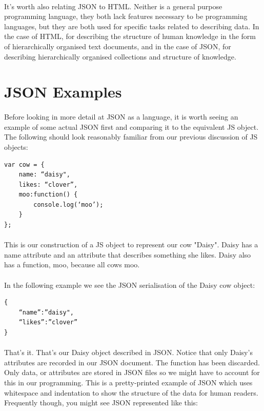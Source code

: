 \paragraph{} It's worth also relating JSON to HTML. Neither is a general purpose programming language, they both lack features necessary to be programming languages, but they are both used for specific tasks related to describing data. In the case of HTML, for describing the structure of human knowledge in the form of hierarchically organised text documents, and in the case of JSON, for describing hierarchically organised collections and structure of knowledge.



\section{JSON Examples}
\paragraph{} Before looking in more detail at JSON as a language, it is worth seeing an example of some actual JSON first and comparing it to the equivalent JS object. The following should look reasonably familiar from our previous discussion of JS objects:

\begin{lstlisting}
var cow = {
	name: “daisy",
	likes: “clover”, 
	moo:function() {
		console.log(‘moo’);
	}
};
\end{lstlisting}

\paragraph{} This is our construction of a JS object to represent our cow "Daisy". Daisy has a name attribute and an attribute that describes something she likes. Daisy also has a function, moo, because all cows moo.
\paragraph{} In the following example we see the JSON serialisation of the Daisy cow object:

\begin{lstlisting}
{
	“name”:”daisy",
	“likes”:”clover”
}
\end{lstlisting}

\paragraph{} That's it. That's our Daisy object described in JSON. Notice that only Daisy's attributes are recorded in our JSON document. The function has been discarded. Only data, or attributes are stored in JSON files so we might have to account for this in our programming. This is a pretty-printed example of JSON which uses whitespace and indentation to show the structure of the data for human readers. Frequently though, you might see JSON represented like this:

